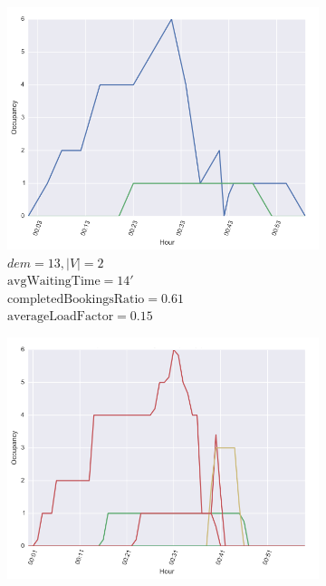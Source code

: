 \documentclass[12pt,a4paper]{article}
\begin{document}
\begin{figure}[]

  \centering
\begin{subfigure}[b]{0.48\textwidth}
  \includegraphics[width=\linewidth]{./images/dem13v2}
  \caption{$dem = 13, |V| = 2$\\ $\text{avgWaitingTime} = 14'$\\ $\text{completedBookingsRatio} = 0.61$ \\ $\text{averageLoadFactor} = 0.15$}
  \label{dem13v2}
\end{subfigure}
\begin{subfigure}[b]{0.48\textwidth}
  \includegraphics[width=\linewidth]{./images/dem13v10}

\end{subfigure}
\end{figure}
\end{document}
